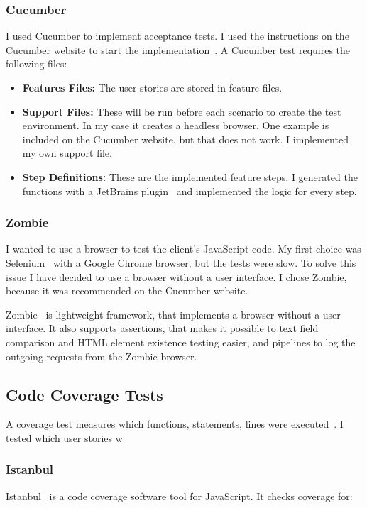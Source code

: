 \subsubsection{Cucumber}
\label{cucumber-test}

I used Cucumber  to implement acceptance tests. I used the instructions on the Cucumber website to start the implementation~\cite{github-cucumberjs}. A Cucumber test requires the following files:

\begin{itemize}
	\item \textbf{Features Files:} The user stories are stored in feature files.
	\item \textbf{Support Files:} These will be run before each scenario to create the test environment. In my case it creates a headless browser. One example is included on the Cucumber website, but that does not work. I implemented my own support file.
	\item \textbf{Step Definitions:} These are the implemented feature steps. I generated the functions with a JetBrains plugin~\cite{jetbrains-cucumber} and implemented the logic for every step. 
\end{itemize}

\subsubsection{Zombie}
I wanted to use a browser to test the client's JavaScript code. My first choice was Selenium~\cite{selenium} with a Google Chrome browser, but the tests were slow. To solve this issue I have decided to use a browser without a user interface. I chose Zombie, because it was recommended on the Cucumber website.

Zombie~\cite{zombie} is lightweight framework, that implements a browser without a user interface. It also supports assertions, that makes it possible to text field comparison and HTML element existence testing easier, and pipelines to log the outgoing requests from the Zombie browser. 

\subsection{Code Coverage Tests}
A coverage test measures which functions, statements, lines were executed~\cite{szofttech}. I tested which user stories w

\subsubsection{Istanbul}
Istanbul~\cite{istanbul} is a code coverage software tool for JavaScript. It checks coverage for:


